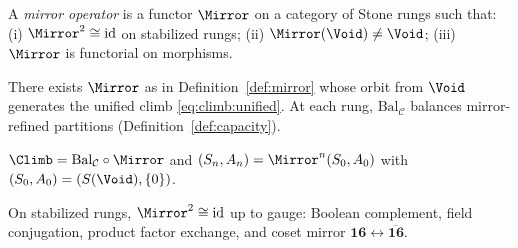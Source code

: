 \begin{definition}\label{def:mirror}
A \emph{mirror operator} is a functor $\Mirror$ on a category of Stone rungs
such that: (i) $\Mirror^2\cong\mathrm{id}$ on stabilized rungs; (ii)
$\Mirror(\Void)\neq\Void$; (iii) $\Mirror$ is functorial on morphisms.
\end{definition}

\begin{axiom}[Mirror]\label{ax:mirror}
There exists $\Mirror$ as in Definition~\ref{def:mirror} whose orbit from
$\Void$ generates the unified climb \eqref{eq:climb:unified}. At each rung,
$\mathrm{Bal}_{\mathcal{C}}$ balances mirror-refined partitions
(Definition~\ref{def:capacity}).
\end{axiom}

\begin{definition}\label{def:climb}
$\Climb=\mathrm{Bal}_{\mathcal{C}}\circ\Mirror$ and
$(S_n,A_n)=\Mirror^n(S_0,A_0)$ with $(S_0,A_0)=(S(\Void),\{0\})$.
\end{definition}

\begin{proposition}[Involution]\label{prop:mirror:involution}
On stabilized rungs, $\Mirror^2\cong\mathrm{id}$ up to gauge: Boolean
complement, field conjugation, product factor exchange, and coset mirror
$\mathbf{16}\leftrightarrow\overline{\mathbf{16}}$.
\end{proposition}